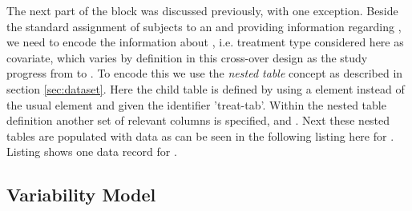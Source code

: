 The next part of the  block was discussed previously, 
with one exception. Beside the standard assignment of subjects to an 
and providing information regarding , we need to encode the information
about , i.e. treatment type considered here as covariate, which varies
by definition in this cross-over design as the study progress from 
to . To encode this we use the \textit{nested table} concept as described 
in section \ref{sec:dataset}. 
Here the child table is defined by using a  element instead of the 
usual  element and given the identifier 'treat-tab'. 
Within the nested table definition another set of relevant columns is specified, 
 and . Next these nested tables are populated with 
data as can be seen in the following listing 
here for .
Listing 
shows one data record for .




\subsection{Variability Model}
\label{eg6:variabilityModel}


